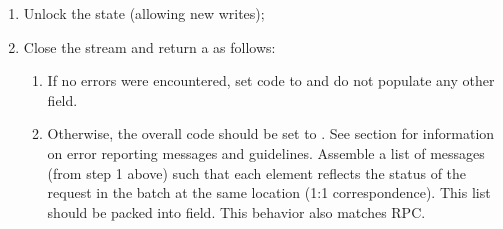 \documentclass[11pt]{article}
\begin{document}
{\begin{enumerate}
\begin{enumerate}
\item{}
If the \emph{request} is invalid (invalid-argument, not-supported, etc.),
prepare a  with relevant canonical code to capture the error.%
\end{enumerate}%

\item{}
Unlock the state (allowing new writes);%

\item{}
Close the  stream and return a  as follows:%

\begin{enumerate}%

\item{}
If no errors were encountered, set code to  and do not populate any
other field.%

\item{}
Otherwise, the overall code should be set to . See section
 for information
on error reporting messages and guidelines. Assemble a list of 
messages (from step 1 above) such that each element reflects the status
of the request in the batch at the same location (1:1
correspondence). This list should be packed into
 field. This behavior also matches 
RPC.%
\end{enumerate}%
\end{enumerate}%

}
\end{document}
